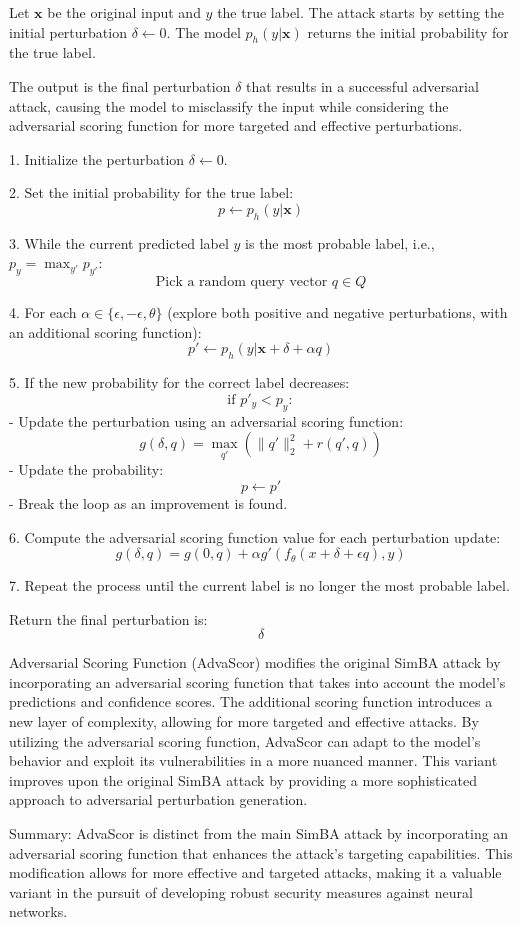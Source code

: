 Let \( \mathbf{x} \) be the original input and \( y \) the true label. The attack starts by setting the initial perturbation \( \delta \leftarrow 0 \). The model \( p_h(y | \mathbf{x}) \) returns the initial probability for the true label.

The output is the final perturbation \( \delta \) that results in a successful adversarial attack, causing the model to misclassify the input while considering the adversarial scoring function for more targeted and effective perturbations.

1. Initialize the perturbation $\delta \leftarrow 0$.

2. Set the initial probability for the true label: 
\[
p \leftarrow p_h(y | \mathbf{x})
\]

3. While the current predicted label $y$ is the most probable label, i.e., $p_y = \max_{y'} p_{y'}$:
\[
\text{Pick a random query vector } q \in Q
\]

4. For each $\alpha \in \{\epsilon, -\epsilon, \theta\}$ (explore both positive and negative perturbations, with an additional scoring function):
\[
p' \leftarrow p_h(y | \mathbf{x} + \delta + \alpha q)
\]

5. If the new probability for the correct label decreases:
\[
\text{if } p'_y < p_y:
\]
    - Update the perturbation using an adversarial scoring function: 
    \[
    g(\delta, q) = \max_{q'} \left( \|q'\|_2^2 + r(q', q) \right)
    \]
    - Update the probability:
    \[
    p \leftarrow p'
    \]
    - Break the loop as an improvement is found.

6. Compute the adversarial scoring function value for each perturbation update: 
\[
g(\delta, q) = g(0, q) + \alpha g'(f_\theta(x + \delta + \epsilon q), y)
\]

7. Repeat the process until the current label is no longer the most probable label.

Return the final perturbation is:
\[
\delta
\]

Adversarial Scoring Function (AdvaScor) modifies the original SimBA attack by incorporating an adversarial scoring function that takes into account the model's predictions and confidence scores. The additional scoring function introduces a new layer of complexity, allowing for more targeted and effective attacks. By utilizing the adversarial scoring function, AdvaScor can adapt to the model's behavior and exploit its vulnerabilities in a more nuanced manner. This variant improves upon the original SimBA attack by providing a more sophisticated approach to adversarial perturbation generation.

Summary: AdvaScor is distinct from the main SimBA attack by incorporating an adversarial scoring function that enhances the attack's targeting capabilities. This modification allows for more effective and targeted attacks, making it a valuable variant in the pursuit of developing robust security measures against neural networks.